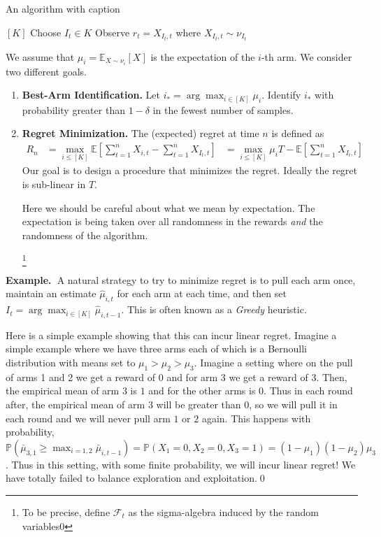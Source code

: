 \documentclass[11pt]{article}
\newcommand{\example}{\noindent\textbf{Example.\  }}
\renewcommand{\P}{\mathbb{P}}
\newcommand{\E}{\mathbb{E}}
\newcommand{\1}{\mathbf{1}}
\begin{document}
\begin{algorithm}
\caption{An algorithm with caption}\label{alg:cap}
\begin{algorithmic}
\State $[K]$
    \State Choose $I_t\in K$
    \State Observe $r_t = X_{I_t, t}$ where $X_{I_t,t} \sim \nu_{I_t}$
\EndFor
\end{algorithmic}
\end{algorithm}


We assume that $\mu_i = \E_{X\sim \nu_i}[X]$ is the expectation of the $i$-th arm. We consider two different goals.
\begin{enumerate}
    \item \textbf{Best-Arm Identification.} Let $i_{\ast} = \arg\max_{i\in [K]}  \mu_i$. Identify $i_{\ast}$ with probability greater than $1-\delta$ in the fewest number of samples.
    \item \textbf{Regret Minimization.} The (expected) regret at time $n$ is defined as 
    \begin{align*}
        R_{n} &= \max_{i\leq [K]}\E\left[\sum_{t=1}^n X_{i, t} - \sum_{t=1}^n X_{I_t, t}\right]
              &= \max_{i\leq [K]} \mu_i T - \E[\sum_{t=1}^n X_{I_t, t}]
    \end{align*}
    Our goal is to design a procedure that minimizes the regret. Ideally the regret is sub-linear in $T$.
    
    Here we should be careful about what we mean by expectation. The expectation is being taken over all randomness in the rewards \textit{and} the randomness of the algorithm. 

    \footnote{To be precise, define $\mathcal{F}_t$ as the sigma-algebra induced by the random variables0 }
\end{enumerate}

\example A natural strategy to try to minimize regret is to pull each arm once, maintain an estimate $\hat{\mu}_{i,t}$ for each arm at each time, and then set $I_t = \arg\max_{i\in [K]} \hat{\mu}_{i,t-1}$. This is often known as a \textit{Greedy} heuristic. 

Here is a simple example showing that this can incur linear regret. Imagine a simple example where we have three arms each of which is a Bernoulli distribution with means set to $\mu_1 > \mu_2 > \mu_3$. 
Imagine a setting where on the pull of arms 1 and 2 we get a reward of $0$ and for arm $3$ we get a reward of $3$. Then, the empirical mean of arm $3$ is $1$ and for the other arms is $0$. Thus in each round after, the empirical mean of arm $3$ will be greater than $0$, so we will pull it in each round and we will never pull arm $1$ or $2$ again. This happens with probability,
$\P(\bar{\mu}_{3,1} \geq \max_{i=1,2} \bar{\mu}_{i, t-1}) = \P(X_{1}=0, X_2=0, X_3 = 1) = (1-\mu_1)(1-\mu_2)\mu_3$. Thus in this setting, with some finite probability, we will incur linear regret! We have totally failed to balance exploration and exploitation.\qed
\end{document}
